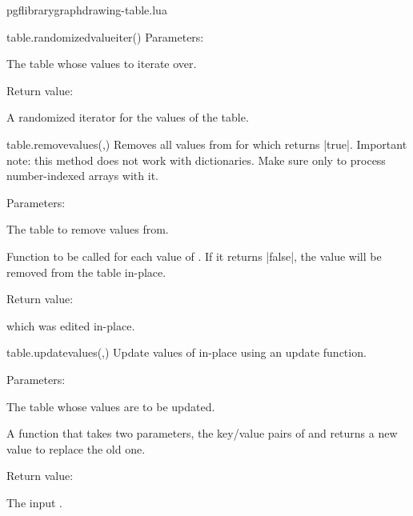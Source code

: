 \begin{filedescription}{pgflibrarygraphdrawing-table.lua}
\begin{luacommand}{{table.randomized\textunderscore{}value\textunderscore{}iter}()}
Parameters:
\begin{parameterdescription}
	\item[\meta{table}] The table whose values to iterate over. 
\end{parameterdescription}


Return value:
\begin{parameterdescription} 
  \item[] A randomized iterator for the values of the table. 
\end{parameterdescription}


\end{luacommand}
\begin{luacommand}{{table.remove\textunderscore{}values}(,)}
Removes all values from  for which  returns |true|.  Important note: this method does not work with dictionaries. Make sure only to process number-indexed arrays with it. 

Parameters:
\begin{parameterdescription}
	\item[\meta{input}] The table to remove values from.\item[\meta{remove\_func}] Function to be called for each value of . If it returns |false|, the value will be removed from the table in-place. 
\end{parameterdescription}


Return value:
\begin{parameterdescription} 
  \item[]  which was edited in-place. 
\end{parameterdescription}


\end{luacommand}
\begin{luacommand}{{table.update\textunderscore{}values}(,)}
Update values of  in-place using an update function. 

Parameters:
\begin{parameterdescription}
	\item[\meta{table}] The table whose values are to be updated.\item[\meta{update\_func}] A function that takes two parameters, the key/value pairs of  and returns a new value to replace the old one. 
\end{parameterdescription}


Return value:
\begin{parameterdescription} 
  \item[] The input . 
\end{parameterdescription}



\end{luacommand}
\end{filedescription}
